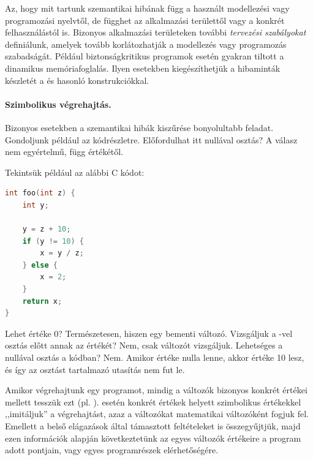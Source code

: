 %

Az, hogy mit tartunk szemantikai hibának függ a használt modellezési vagy programozási nyelvtől, de függhet az alkalmazási területtől vagy a konkrét felhasználástól is. Bizonyos alkalmazási területeken további \emph{tervezési szabályokat} definiálunk, amelyek tovább korlátozhatják a modellezés vagy programozás szabadságát. Például biztonságkritikus programok esetén gyakran tiltott a dinamikus memóriafoglalás. Ilyen esetekben kiegészíthetjük a hibaminták készletét a  és hasonló konstrukciókkal.

\paragraph{Szimbolikus végrehajtás.}
Bizonyos esetekben a szemantikai hibák kiszűrése bonyolultabb feladat. Gondoljunk például az  kódrészletre. Előfordulhat itt nullával osztás? A válasz nem egyértelmű, függ  értékétől.

\begin{pelda}
Tekintsük például az alábbi C kódot:
\begin{lstlisting}[language=C]
int foo(int z) {
    int y;

    y = z + 10;
    if (y != 10) {
        x = y / z;
    } else {
        x = 2;
    }
    return x;
}
\end{lstlisting}

Lehet  értéke 0? Természetesen, hiszen  egy bementi változó. Vizsgáljuk a -vel osztás előtt annak az értékét? Nem, csak  változót vizsgáljuk. Lehetséges a nullával osztás a kódban? Nem. Amikor  értéke nulla lenne, akkor  értéke 10 lesz, és így az osztást tartalmazó utasítás nem fut le.
\end{pelda}

Amikor végrehajtunk egy programot, mindig a változók bizonyos konkrét értékei mellett tesszük ezt (pl. ).  esetén konkrét értékek helyett szimbolikus értékekkel ,,imitáljuk'' a végrehajtást, azaz a változókat matematikai változóként fogjuk fel. Emellett a belső elágazások által támasztott feltételeket is összegyűjtjük, majd ezen információk alapján következtetünk az egyes változók értékeire a program adott pontjain, vagy egyes programrészek elérhetőségére.

